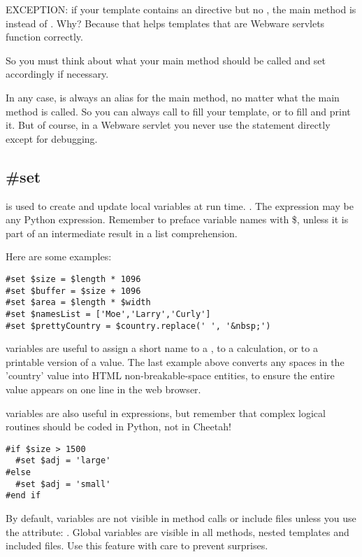 EXCEPTION: if your template contains an  directive but no
, the main method is  instead of
.  Why?  Because that helps templates that are Webware
servlets function correctly.

So you must think about what your main method should be called and set
 accordingly if necessary.

In any case,  is always an alias for the main method, no
matter what the main method is called.  So you can always call  to
fill your template, or  to fill and print it.  But of course, in
a Webware servlet you never use the  statement directly except for
debugging.


\subsection{\#set}
\label{inheritanceEtc.set}

 is used to create and update local variables at run time.
. The expression may be any Python expression.
Remember to preface variable names with \$, unless it is part of an
intermediate result in a list comprehension.

Here are some examples:
\begin{verbatim}
#set $size = $length * 1096
#set $buffer = $size + 1096
#set $area = $length * $width
#set $namesList = ['Moe','Larry','Curly']
#set $prettyCountry = $country.replace(' ', '&nbsp;')
\end{verbatim}

 variables are useful to assign a short name to a
, to a calculation, or to a printable version of
a value.  The last example above converts any spaces in the 'country' value
into HTML non-breakable-space entities, to ensure the entire value appears on
one line in the web browser.

 variables are also useful in  expressions, but
remember that complex logical routines should be coded in Python, not in
Cheetah!
\begin{verbatim}
#if $size > 1500
  #set $adj = 'large'
#else
  #set $adj = 'small'
#end if
\end{verbatim}

By default,  variables are not visible in method calls or include
files unless you use the  attribute: .  Global variables are visible in all methods, nested templates and
included files.  Use this feature with care to prevent surprises.


